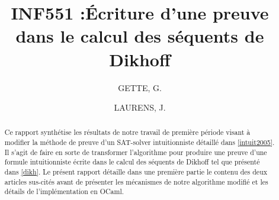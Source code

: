 \documentclass[10pt, a4paper]{amsart}
\title{INF551 :\'Ecriture d'une preuve dans le calcul des s\'equents de Dikhoff
}
\author{GETTE, G. \and LAURENS, J.}
\begin{document}
\begin{abstract}
  Ce rapport synth\'etise les résultats de notre travail de premi\`ere p\'eriode visant à modifier la méthode de preuve d'un SAT-solver intuitionniste détaillé dans \ref{intuit2005}. Il s'agit de faire en sorte de transformer l'algorithme pour produire une preuve d'une formule intuitionniste écrite dans le calcul des séquents de Dikhoff tel que pr\'esent\'e dans \ref{dikh}.
Le présent rapport d\'etaille dans une premi\`ere partie le contenu des deux articles sus-cit\'es avant de pr\'esenter les mécanismes de notre algorithme modifi\'e et les d\'etails de l'impl\'ementation en OCaml.
\end{abstract}

\maketitle
\tableofcontents
\newpage




\end{document}
